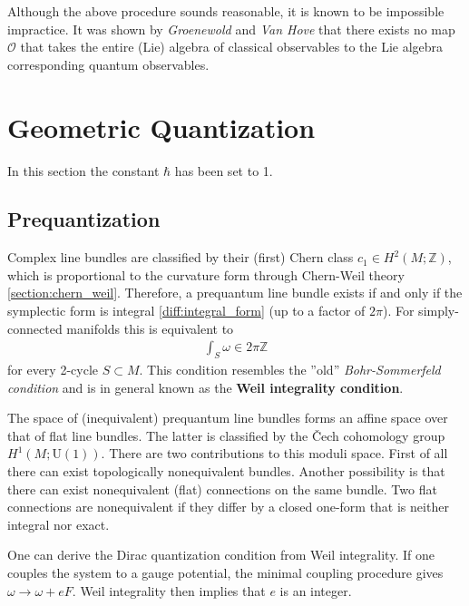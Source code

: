     Although the above procedure sounds reasonable, it is known to be impossible impractice. It was shown by \textit{Groenewold} and \textit{Van Hove} that there exists no map $\mathcal{O}$ that takes the entire (Lie) algebra of classical observables to the Lie algebra corresponding quantum observables.

\section{Geometric Quantization}\label{section:geometric_quantization}

    In this section the constant $\hbar$ has been set to 1.

\subsection{Prequantization}

    \begin{property}
        Complex line bundles are classified by their (first) Chern class $c_1\in H^2(M;\mathbb{Z})$, which is proportional to the curvature form through Chern-Weil theory \ref{section:chern_weil}. Therefore, a prequantum line bundle exists if and only if the symplectic form is integral \ref{diff:integral_form} (up to a factor of $2\pi$). For simply-connected manifolds this is equivalent to
        \begin{gather}
            \int_S\omega \in 2\pi\mathbb{Z}
        \end{gather}
        for every 2-cycle $S\subset M$. This condition resembles the ''old'' \textit{Bohr-Sommerfeld condition} and is in general known as the \textbf{Weil integrality condition}.

        The space of (inequivalent) prequantum line bundles forms an affine space over that of flat line bundles. The latter is classified by the \v{C}ech cohomology group $H^1(M; \text{U}(1))$. There are two contributions to this moduli space. First of all there can exist topologically nonequivalent bundles. Another possibility is that there can exist nonequivalent (flat) connections on the same bundle. Two flat connections are nonequivalent if they differ by a closed one-form that is neither integral nor exact.
    \end{property}
    \begin{result}
        One can derive the Dirac quantization condition from Weil integrality. If one couples the system to a gauge potential, the minimal coupling procedure gives $\omega\longrightarrow\omega+eF$. Weil integrality then implies that $e$ is an integer.
    \end{result}

